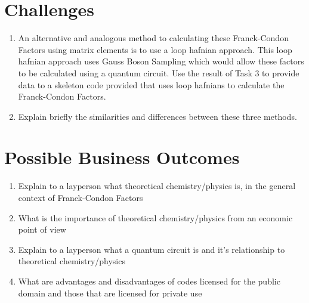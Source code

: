 \documentclass[12pt]{article}
\begin{document}
\section{Challenges}

\begin{enumerate}
    \item An alternative and analogous method to calculating these Franck-Condon Factors using matrix elements is to use a loop hafnian approach. This loop hafnian approach uses Gauss Boson Sampling which would allow these factors to be calculated using a quantum circuit. Use the result of Task 3 to provide data to a skeleton code provided that uses loop hafnians to calculate the Franck-Condon Factors.
    \item Explain briefly the similarities and differences between these three methods.
\end{enumerate}

\section{Possible Business Outcomes}

\begin{enumerate}
    \item Explain to a layperson what theoretical chemistry/physics is, in the general context of Franck-Condon Factors
    \item What is the importance of theoretical chemistry/physics from an economic point of view
    \item Explain to a layperson what a quantum circuit is and it's relationship to theoretical chemistry/physics
    \item What are advantages and disadvantages of codes licensed for the public domain and those that are licensed for private use
\end{enumerate}

\newpage



\end{document}
